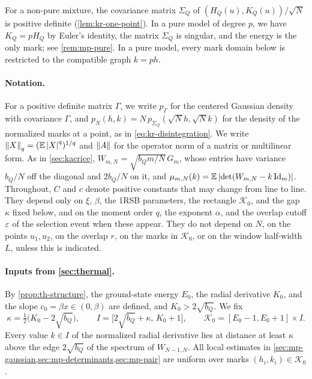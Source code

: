 For a non-pure mixture, the covariance matrix $\Sigma_Q$ of $(H_Q(u),K_Q(u))/\sqrt N$ is positive definite (\cref{lem:kr-one-point}). In a pure model of degree $p$, we have $K_Q=pH_Q$ by Euler's identity, the matrix $\Sigma_Q$ is singular, and the energy is the only mark; see \cref{rem:mp-pure}. In a pure model, every mark domain below is restricted to the compatible graph $k=ph$.

\paragraph{Notation.}
For a positive definite matrix $\Gamma$, we write $p_\Gamma$ for the centered Gaussian density with covariance $\Gamma$, and $p_N(h,k)=N\,p_{\Sigma_Q}(\sqrt Nh,\sqrt Nk)$ for the density of the normalized marks at a point, as in \eqref{eq:kr-disintegration}. We write $\left\lVert X\right\rVert_q=(\mathbb E\left|X\right|^q)^{1/q}$ and $\left\lVert A\right\rVert$ for the operator norm of a matrix or multilinear form. As in \cref{sec:kacrice}, $W_{m,N}=\sqrt{b_Qm/N}\,G_m$, whose entries have variance $b_Q/N$ off the diagonal and $2b_Q/N$ on it, and $\mu_{m,N}(k)=\mathbb E\left|\det(W_{m,N}-k\,\mathrm{Id}_m)\right|$. Throughout, $C$ and $c$ denote positive constants that may change from line to line. They depend only on $\xi$, $\beta$, the 1RSB parameters, the rectangle $\mathcal K_0$, and the gap $\kappa$ fixed below, and on the moment order $q$, the exponent $\alpha$, and the overlap cutoff $\varepsilon$ of the selection event when these appear. They do not depend on $N$, on the points $u_1,u_2$, on the overlap $r$, on the marks in $\mathcal K_0$, or on the window half-width $L$, unless this is indicated.

\paragraph{Inputs from \cref{sec:thermal}.}
By \cref{prop:th-structure}, the ground-state energy $E_0$, the radial derivative $K_0$, and the slope $c_0=\beta x\in(0,\beta)$ are defined, and $K_0>2\sqrt{b_Q}$. We fix
\begin{equation}\label{eq:mp-K0}
\kappa=\tfrac12\bigl(K_0-2\sqrt{b_Q}\bigr),\qquad I=\bigl[2\sqrt{b_Q}+\kappa,\,K_0+1\bigr],\qquad \mathcal K_0=[E_0-1,E_0+1]\times I.
\end{equation}
Every value $k\in I$ of the normalized radial derivative lies at distance at least $\kappa$ above the edge $2\sqrt{b_Q}$ of the spectrum of $W_{N-1,N}$. All local estimates in \cref{sec:mp-gaussian,sec:mp-determinants,sec:mp-pair} are uniform over marks $(h_i,k_i)\in\mathcal K_0$.

